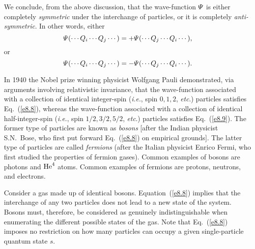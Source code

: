 We conclude, from the above discussion, that the wave-function ${\mit\Psi}$ is
either completely {\em symmetric}\/ under the interchange of particles, or
it is completely {\em anti-symmetric}. In other words,
either
\begin{equation}
{\mit\Psi}(\cdots Q_i\cdots Q_j\cdots)=
+{\mit\Psi}(\cdots Q_j\cdots Q_i\cdots),\label{e8.8}
\end{equation}
or 
\begin{equation}
{\mit\Psi}(\cdots Q_i\cdots Q_j\cdots)=
-{\mit\Psi}(\cdots Q_j\cdots Q_i\cdots).\label{e8.9}
\end{equation}

In 1940 the Nobel prize winning physicist Wolfgang Pauli demonstrated,
via arguments involving  relativistic invariance, that
the wave-function associated with  a collection of 
identical integer-spin ({\em i.e.}, spin $0, 1, 2$, {\em etc}.)
particles satisfies Eq.~(\ref{e8.8}), whereas the wave-function
associated with a collection of identical half-integer-spin
({\em i.e.}, spin $1/2, 3/2, 5/2$, {\em etc}.)
particles satisfies Eq.~(\ref{e8.9}). The former type of particles
are known as {\em bosons}\/ [after the Indian physicist S.N.~Bose, who
first put forward Eq.~(\ref{e8.8}) on empirical grounds].
The latter type of particles are called  {\em fermions}\/ (after the Italian
physicist  Enrico Fermi, who first studied the properties of
 fermion gases). Common examples of bosons are photons and ${\rm He}^4$ atoms.
Common examples of fermions are protons, neutrons, and electrons. 

Consider a gas made up of
identical bosons. Equation~(\ref{e8.8}) implies that the interchange of any  
two particles
does not lead to a new state of the system. Bosons must, therefore, be
considered as genuinely indistinguishable when enumerating the different possible
states of the gas. Note that Eq.~(\ref{e8.8}) imposes no restriction on how many
particles can occupy a given single-particle quantum state $s$. 


